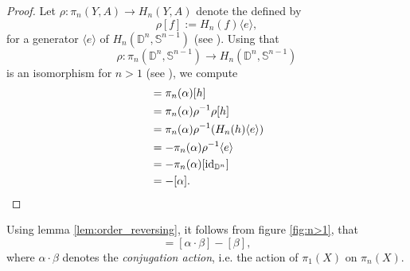\begin{proof}
 	Let $\rho : \pi_n(Y,A) \to H_n(Y,A)$ denote the  defined by
	\begin{equation*}
		\rho[f] := H_n(f)\langle e \rangle,
	\end{equation*}
	\noindent for a generator $\langle e \rangle$ of $H_n(\mathbb{D}^n,\mathbb{S}^{n - 1})$ (see \cite[166]{whitehead:homotopy_theory:1978}). Using that 
	\begin{equation*}
		\rho : \pi_n(\mathbb{D}^n,\mathbb{S}^{n - 1}) \to H_n(\mathbb{D}^n,\mathbb{S}^{n - 1})
	\end{equation*}
	\noindent is an isomorphism for $n >1$ (see \cite[168]{whitehead:homotopy_theory:1978}), we compute
	\begin{align*}
		[\alpha \circ h] &= \pi_n(\alpha)[h]\\
		&= \pi_n(\alpha)\rho^{-1}\rho[h]\\ 
		&= \pi_n(\alpha)\rho^{-1}(H_n(h)\langle e \rangle)\\
		&= -\pi_n(\alpha)\rho^{-1}\langle e \rangle\\
		&= -\pi_n(\alpha)[\id_{\mathbb{D}^n}]\\
		&= - [\alpha].
	\end{align*}
\end{proof}

Using lemma \ref{lem:order_reversing}, it follows from figure \ref{fig:n>1}, that
\begin{equation*}
	[\alpha,\beta] = [\alpha \cdot \beta] - [\beta],
\end{equation*}
\noindent where $\alpha \cdot \beta$ denotes the \emph{conjugation action}, i.e. the action of $\pi_1(X)$ on $\pi_n(X)$.

